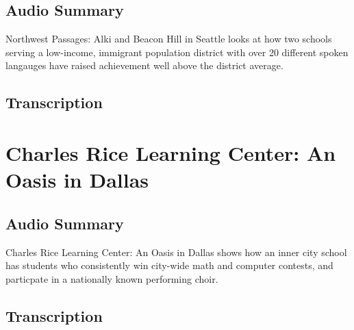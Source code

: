 \subsection{Audio Summary}

Northwest Passages: Alki and Beacon Hill in Seattle looks at how two schools serving a low-income, immigrant population district with over 20 different spoken langauges have raised achievement well above the district average.

\subsection{Transcription}

\section{Charles Rice Learning Center: An Oasis in Dallas}

\subsection{Audio Summary}

Charles Rice Learning Center: An Oasis in Dallas shows how an inner city school has students who consistently win city-wide math and computer contests, and particpate in a nationally known performing choir.

\subsection{Transcription}
